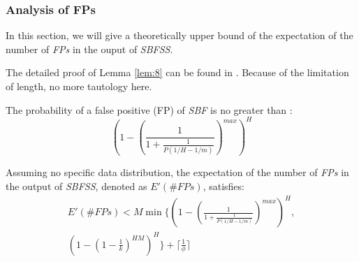\documentclass[conference]{IEEEtran}
\begin{document}
\subsubsection{\textbf{Analysis of FPs}}
In this section, we will give a theoretically upper bound of the expectation of the number of \emph{FPs} in the ouput of \emph{SBFSS}.\par
The detailed proof of Lemma \ref{lem:8} can be found in \cite{IEEEexample:sbf}. Because of the limitation of length, no more tautology here.
\begin{lemma}\label{lem:8}
The probability of a false positive (FP) of \emph{SBF} is no greater than :
\begin{equation}
(1-(\frac{1}{1+\frac{1}{P(1/H-1/m)}})^{max})^H
\end{equation}
\end{lemma}

\begin{theorem}\label{thm:6}
Assuming no specific data distribution, the expectation of the number of \emph{FPs} in the output of \emph{SBFSS}, denoted as $E'(\#FPs)$, satisfies:
\begin{eqnarray}\label{eq:17}
E'(\#FPs)<M \min \{(1-(\frac{1}{1+\frac{1}{P(1/H-1/m)}})^{max})^H,\\\nonumber
	(1-(1-\frac{1}{k})^{HM})^H\} + \lceil\frac{1}{\phi}\rceil
\end{eqnarray}
\end{theorem}
\end{document}
